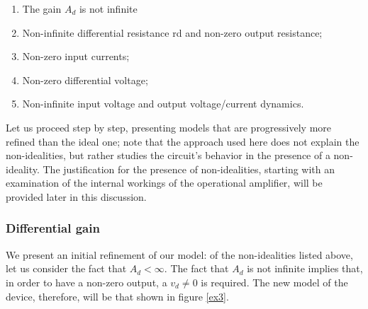 \documentclass[../main.tex]{subfiles}
\begin{document}
\begin{enumerate}[label=\textbf{-}]
	\item The gain $A_d$ is not infinite
	\item Non-infinite differential resistance rd and non-zero output resistance;
	\item Non-zero input currents;
	\item Non-zero differential voltage;
	\item Non-infinite input voltage and output voltage/current dynamics.
\end{enumerate}


Let us proceed step by step, presenting models that are progressively more refined than the ideal one; note that the approach used here does not explain the non-idealities, but rather studies the circuit’s behavior in the presence of a non-ideality. 
The justification for the presence of non-idealities, starting with an examination of the internal workings of the operational amplifier, will be provided later in this discussion.

\subsubsection*{Differential gain}

We present an initial refinement of our model: of the non-idealities listed above, let us consider the fact that $A_d < \infty$. The fact that $A_d$ is not infinite implies that, in order to have a non-zero output, a $v_d \neq 0$ is required. The new model of the device, therefore, will be that shown in figure \ref{ex3}.
\end{document}
